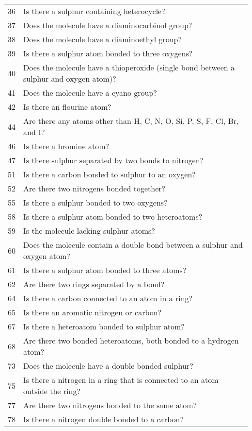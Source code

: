 \begin{tabular}{ll}
36 &  Is there a sulphur containing heterocycle?  \\
37 &  Does the molecule have a diaminocarbinol group?   \\
38 &  Does the molecule have a diaminoethyl group?   \\
39 &  Is there a sulphur atom bonded to three oxygens?   \\
40 &  Does the molecule have a thioperoxide (single bond between a sulphur and oxygen atom)?  \\
41 &  Does the molecule have a cyano group?   \\
42 &  Is there an flourine atom?  \\
44 &  Are there any atoms other than H, C, N, O, Si, P, S, F, Cl, Br, and I?  \\
46 &  Is there a bromine atom?   \\
47 &  Is there sulphur separated by two bonds to nitrogen?   \\
51 &  Is there a carbon bonded to sulphur to an oxygen?   \\
52 &  Are there two nitrogens bonded together?   \\
55 &  Is there a sulphur bonded to two oxygens?   \\
58 &  Is there a sulphur atom bonded to two heteroatoms?   \\
59 &  Is the molecule lacking sulphur atoms?   \\
60 &  Does the molecule contain a double bond between a sulphur and oxygen atom?   \\
61 &  Is there a sulphur atom bonded to three atoms?   \\
62 &  Are there two rings separated by a bond?   \\
64 &  Is there a carbon connected to an atom in a ring?   \\
65 &  Is there an aromatic nitrogen or carbon?   \\
67 &  Is there a heteroatom bonded to sulphur atom?   \\
68 &  Are there two bonded heteroatoms, both bonded to a hydrogen atom?  \\
73 &  Does the molecule have a double bonded sulphur?   \\
75 &  Is there a nitrogen in a ring that is connected to an atom outside the ring?   \\
77 &  Are there two nitrogens bonded to the same atom?   \\
78 &  Is there a nitrogen double bonded to a carbon?  \\

\end{tabular}
